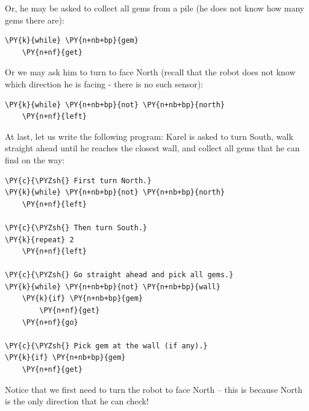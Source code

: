 \noindent
Or, he may be asked to collect all gems from a pile (he does not know 
how many gems there are):\\

\begin{bbox}
\begin{Verbatim}[commandchars=\\\{\}]
\PY{k}{while} \PY{n+nb+bp}{gem}
    \PY{n+nf}{get}
\end{Verbatim}
\end{bbox}
\vspace{6mm}

\noindent
Or we may ask him to turn to face North (recall that the robot does not know which direction he is
facing - there is no such sensor):\\

\begin{bbox}
\begin{Verbatim}[commandchars=\\\{\}]
\PY{k}{while} \PY{n+nb+bp}{not} \PY{n+nb+bp}{north}
    \PY{n+nf}{left}
\end{Verbatim}
\end{bbox}
\vspace{6mm}

\noindent
At last, let us write the following program: Karel is asked to 
turn South, walk straight ahead until he reaches the closest wall, and 
collect all gems that he can find on the way:

\begin{bbox}
\begin{Verbatim}[commandchars=\\\{\}]
\PY{c}{\PYZsh{} First turn North.}
\PY{k}{while} \PY{n+nb+bp}{not} \PY{n+nb+bp}{north}
    \PY{n+nf}{left}

\PY{c}{\PYZsh{} Then turn South.}
\PY{k}{repeat} 2
    \PY{n+nf}{left}

\PY{c}{\PYZsh{} Go straight ahead and pick all gems.}
\PY{k}{while} \PY{n+nb+bp}{not} \PY{n+nb+bp}{wall}
    \PY{k}{if} \PY{n+nb+bp}{gem}
        \PY{n+nf}{get}
    \PY{n+nf}{go}

\PY{c}{\PYZsh{} Pick gem at the wall (if any).}
\PY{k}{if} \PY{n+nb+bp}{gem}
    \PY{n+nf}{get}
\end{Verbatim}
\end{bbox}
\vspace{6mm}

\noindent
Notice that we first need to turn the robot to face North -- this is because North 
is the only direction that he can check!


